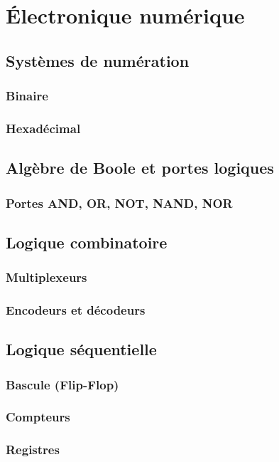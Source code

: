 \chapter{Électronique numérique} \label{chap:digital_electronics}
\section{Systèmes de numération} \label{subsec:number_systems}
\subsection{Binaire} \label{subsec:binary}
\subsection{Hexadécimal} \label{subsec:hexadecimal}
\section{Algèbre de Boole et portes logiques} \label{subsec:boolean_logic}
\subsection{Portes AND, OR, NOT, NAND, NOR} \label{subsec:logic_gates}
\section{Logique combinatoire} \label{subsec:combinational_logic}
\subsection{Multiplexeurs} \label{subsec:multiplexers}
\subsection{Encodeurs et décodeurs} \label{subsec:encoders_decoders}
\section{Logique séquentielle} \label{subsec:sequential_logic}
\subsection{Bascule (Flip-Flop)} \label{subsec:flip_flops}
\subsection{Compteurs} \label{subsec:counters}
\subsection{Registres} \label{subsec:registers}
